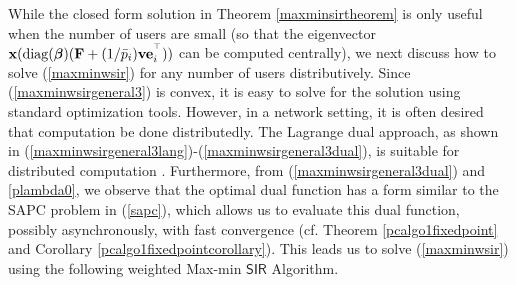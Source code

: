 \documentclass[10pt,twocolumn]{IEEEtran}
\newcommand{\0}{\mathbf{0}}
\newcommand{\1}{\mathbf{1}}
\def\diag{\mathop{{\rm diag}}\nolimits}
\newcommand{\trans}{^\top}
\newtheorem{theorem}{Theorem}
\newtheorem{algorithm}{Algorithm}
\begin{document}
While the closed form solution in Theorem \ref{maxminsirtheorem} is only useful when the number of users are small (so that the eigenvector $\mathbf{x}(\diag(\boldsymbol{\beta})(\mathbf{F}+(1/\bar{p}_i)\mathbf{v}\mathbf{e}_i^{\trans}))$ can be computed centrally), we next discuss how to solve (\ref{maxminwsir}) for any number of users distributively. Since (\ref{maxminwsirgeneral3}) is convex, it is easy to solve for the solution using standard optimization tools. However, in a network setting, it is often desired that computation be done distributedly.
The Lagrange dual approach, as shown in (\ref{maxminwsirgeneral3lang})-(\ref{maxminwsirgeneral3dual}), is suitable for distributed computation \cite{Srikant03}. Furthermore, from (\ref{maxminwsirgeneral3dual}) and \ref{plambda0}, we observe that the optimal dual function has a form similar to the SAPC problem in (\ref{sapc}), which allows us to evaluate this dual function, possibly asynchronously, with fast convergence (cf. Theorem \ref{pcalgo1fixedpoint} and Corollary \ref{pcalgo1fixedpointcorollary}).
This leads us to solve (\ref{maxminwsir}) using the following weighted Max-min $\mathsf{SIR}$ Algorithm. 
%
\end{document}

